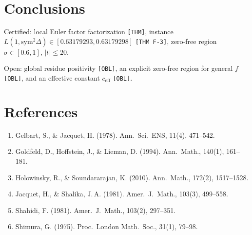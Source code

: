 \documentclass[12pt]{article}
\begin{document}
\section{Conclusions}

Certified: local Euler factor factorization \texttt{[THM]}, instance
$L(1,\mathrm{sym}^2\Delta) \in [0.63179293, 0.63179298]$ \texttt{[THM F-3]},
zero-free region $\sigma \in [0.6,1]$, $|t| \leq 20$.

Open: global residue positivity \texttt{[OBL]}, an explicit zero-free region for general $f$ \texttt{[OBL]}, and
an effective constant $c_{\mathrm{eff}}$ \texttt{[OBL]}.

\section*{References}

\begin{enumerate}
\item Gelbart, S., \& Jacquet, H. (1978). Ann.\ Sci.\ ENS, 11(4), 471--542.
\item Goldfeld, D., Hoffstein, J., \& Lieman, D. (1994). Ann.\ Math., 140(1), 161--181.
\item Holowinsky, R., \& Soundararajan, K. (2010). Ann.\ Math., 172(2), 1517--1528.
\item Jacquet, H., \& Shalika, J.\,A. (1981). Amer.\ J.\ Math., 103(3), 499--558.
\item Shahidi, F. (1981). Amer.\ J.\ Math., 103(2), 297--351.
\item Shimura, G. (1975). Proc.\ London Math.\ Soc., 31(1), 79--98.
\end{enumerate}
\end{document}
